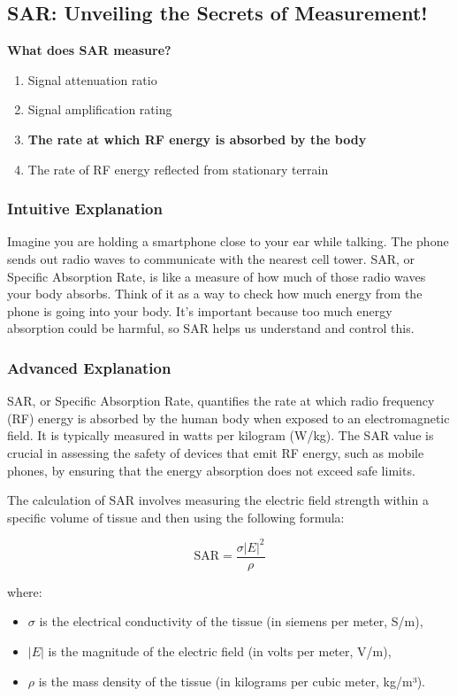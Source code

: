 \subsection{SAR: Unveiling the Secrets of Measurement!}

\begin{tcolorbox}[colback=gray!10!white,colframe=black!75!black,title=\textbf{E0A08}]
\textbf{What does SAR measure?}
\begin{enumerate}[label=\Alph*)]
    \item Signal attenuation ratio
    \item Signal amplification rating
    \item \textbf{The rate at which RF energy is absorbed by the body}
    \item The rate of RF energy reflected from stationary terrain
\end{enumerate}
\end{tcolorbox}

\subsubsection{Intuitive Explanation}
Imagine you are holding a smartphone close to your ear while talking. The phone sends out radio waves to communicate with the nearest cell tower. SAR, or Specific Absorption Rate, is like a measure of how much of those radio waves your body absorbs. Think of it as a way to check how much energy from the phone is going into your body. It’s important because too much energy absorption could be harmful, so SAR helps us understand and control this.

\subsubsection{Advanced Explanation}
SAR, or Specific Absorption Rate, quantifies the rate at which radio frequency (RF) energy is absorbed by the human body when exposed to an electromagnetic field. It is typically measured in watts per kilogram (W/kg). The SAR value is crucial in assessing the safety of devices that emit RF energy, such as mobile phones, by ensuring that the energy absorption does not exceed safe limits.

The calculation of SAR involves measuring the electric field strength within a specific volume of tissue and then using the following formula:

\[
\text{SAR} = \frac{\sigma |E|^2}{\rho}
\]

where:
\begin{itemize}
    \item \(\sigma\) is the electrical conductivity of the tissue (in siemens per meter, S/m),
    \item \(|E|\) is the magnitude of the electric field (in volts per meter, V/m),
    \item \(\rho\) is the mass density of the tissue (in kilograms per cubic meter, kg/m³).
\end{itemize}

